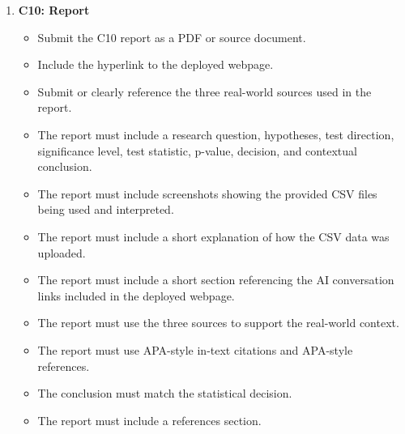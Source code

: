 \documentclass[12pt]{article}
\begin{document}
\begin{enumerate}
		\item \textbf{C10: Report}
		\begin{itemize}
			\item Submit the C10 report as a PDF or source document.
			\item Include the hyperlink to the deployed webpage.
			\item Submit or clearly reference the three real-world sources used in the report.
			\item The report must include a research question, hypotheses, test direction, significance level, test statistic, p-value, decision, and contextual conclusion.
			\item The report must include screenshots showing the provided CSV files being used and interpreted.
			\item The report must include a short explanation of how the CSV data was uploaded.
			\item The report must include a short section referencing the AI conversation links included in the deployed webpage.
			\item The report must use the three sources to support the real-world context.
			\item The report must use APA-style in-text citations and APA-style references.
			\item The conclusion must match the statistical decision.
			\item The report must include a references section.
		\end{itemize}
	\end{enumerate}
	
\end{document}
